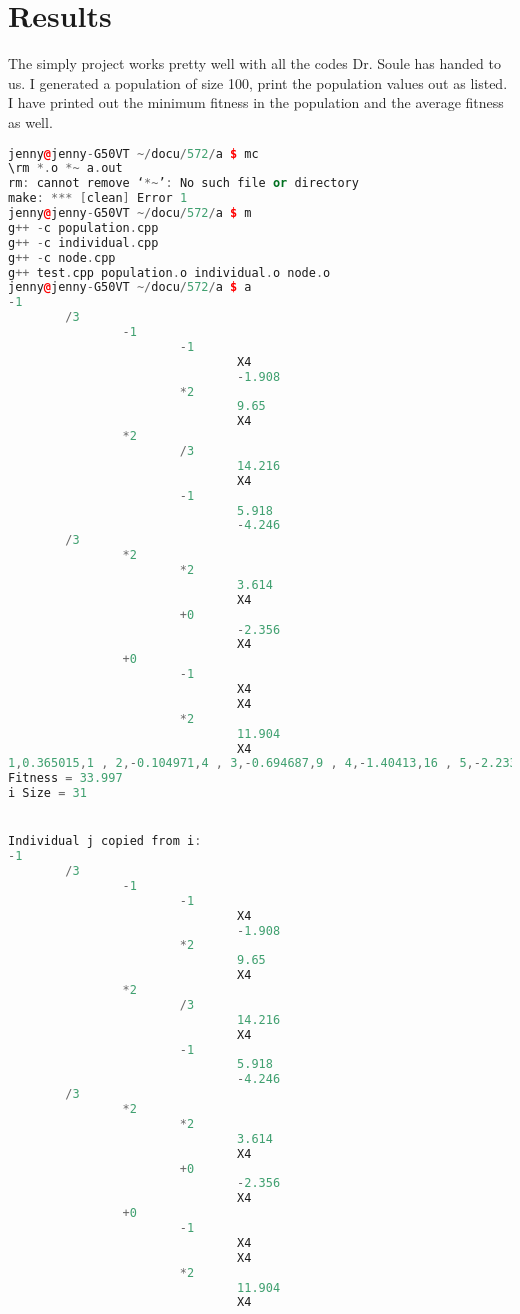 \documentclass[10pt,b5paper]{article}
\begin{document}
\section{Results}
\label{sec-3}
The simply project works pretty well with all the codes Dr. Soule has handed to us. I generated a population of size 100, print the population values out as listed. I have printed out the minimum fitness in the population and the average fitness as well. 

\begin{lstlisting}[language=c++]
jenny@jenny-G50VT ~/docu/572/a $ mc
\rm *.o *~ a.out
rm: cannot remove ‘*~’: No such file or directory
make: *** [clean] Error 1
jenny@jenny-G50VT ~/docu/572/a $ m
g++ -c population.cpp
g++ -c individual.cpp
g++ -c node.cpp
g++ test.cpp population.o individual.o node.o
jenny@jenny-G50VT ~/docu/572/a $ a
-1
        /3
                -1
                        -1
                                X4
                                -1.908
                        *2
                                9.65
                                X4
                *2
                        /3
                                14.216
                                X4
                        -1
                                5.918
                                -4.246
        /3
                *2
                        *2
                                3.614
                                X4
                        +0
                                -2.356
                                X4
                +0
                        -1
                                X4
                                X4
                        *2
                                11.904
                                X4
1,0.365015,1 , 2,-0.104971,4 , 3,-0.694687,9 , 4,-1.40413,16 , 5,-2.23331,25 , 
Fitness = 33.997
i Size = 31


Individual j copied from i: 
-1
        /3
                -1
                        -1
                                X4
                                -1.908
                        *2
                                9.65
                                X4
                *2
                        /3
                                14.216
                                X4
                        -1
                                5.918
                                -4.246
        /3
                *2
                        *2
                                3.614
                                X4
                        +0
                                -2.356
                                X4
                +0
                        -1
                                X4
                                X4
                        *2
                                11.904
                                X4



\end{lstlisting}
\end{document}
